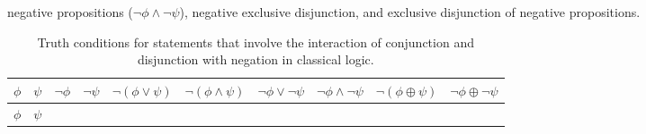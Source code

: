 \documentclass[oneside]{report}
\theoremstyle{definition}
\theoremstyle{definition}
\theoremstyle{definition}
\theoremstyle{remark}
\begin{document}
negative propositions (\(\lnot \phi \land \lnot \psi\)), negative
exclusive disjunction, and exclusive disjunction of negative
propositions.
\begin{longtable}[]{@{}cccccccccc@{}}
\caption{\label{tab:truthtable} Truth conditions for statements that involve
the interaction of conjunction and disjunction with negation in
classical logic.}\tabularnewline
\toprule
\begin{minipage}[b]{0.04\columnwidth}\centering\strut
\(\phi\)\strut
\end{minipage} & \begin{minipage}[b]{0.04\columnwidth}\centering\strut
\(\psi\)\strut
\end{minipage} & \begin{minipage}[b]{0.04\columnwidth}\centering\strut
\(\lnot \phi\)\strut
\end{minipage} & \begin{minipage}[b]{0.04\columnwidth}\centering\strut
\(\lnot \psi\)\strut
\end{minipage} & \begin{minipage}[b]{0.08\columnwidth}\centering\strut
\(\lnot (\phi \lor \psi)\)\strut
\end{minipage} & \begin{minipage}[b]{0.08\columnwidth}\centering\strut
\(\lnot (\phi \land \psi)\)\strut
\end{minipage} & \begin{minipage}[b]{0.08\columnwidth}\centering\strut
\(\lnot \phi \lor \lnot \psi\)\strut
\end{minipage} & \begin{minipage}[b]{0.08\columnwidth}\centering\strut
\(\lnot \phi \land \lnot \psi\)\strut
\end{minipage} & \begin{minipage}[b]{0.09\columnwidth}\centering\strut
\(\lnot (\phi \oplus \psi)\)\strut
\end{minipage} & \begin{minipage}[b]{0.08\columnwidth}\centering\strut
\(\lnot \phi \oplus \lnot \psi\)\strut
\end{minipage}\tabularnewline
\midrule
\endfirsthead
\toprule
\begin{minipage}[b]{0.04\columnwidth}\centering\strut
\(\phi\)\strut
\end{minipage} & \begin{minipage}[b]{0.04\columnwidth}\centering\strut
\(\psi\)\strut
\end{minipage} & \begin{minipage}[b]{0.04\columnwidth}\centering\strut

\end{minipage}
\end{longtable}
\end{document}
